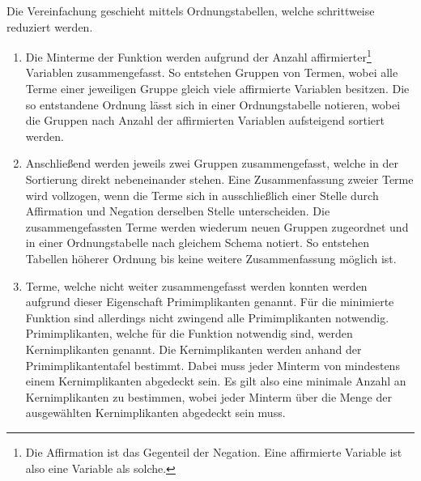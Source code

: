 Die Vereinfachung geschieht mittels Ordnungstabellen, welche schrittweise reduziert werden. 
\begin{enumerate}
  \item Die Minterme der Funktion werden aufgrund der Anzahl affirmierter\footnote{Die Affirmation ist das Gegenteil der Negation. Eine affirmierte Variable ist also eine Variable als solche.} Variablen zusammengefasst. So entstehen Gruppen von Termen, wobei alle Terme einer jeweiligen Gruppe gleich viele affirmierte Variablen besitzen. Die so entstandene Ordnung lässt sich in einer Ordnungstabelle notieren, wobei die Gruppen nach Anzahl der affirmierten Variablen aufsteigend sortiert werden.
  \item Anschließend werden jeweils zwei Gruppen zusammengefasst, welche in der Sortierung direkt nebeneinander stehen. Eine Zusammenfassung zweier Terme wird vollzogen, wenn die Terme sich in ausschließlich einer Stelle durch Affirmation und Negation derselben Stelle unterscheiden. Die zusammengefassten Terme werden wiederum neuen Gruppen zugeordnet und in einer Ordnungstabelle nach gleichem Schema notiert. So entstehen Tabellen höherer Ordnung bis keine weitere Zusammenfassung möglich ist.
  \item Terme, welche nicht weiter zusammengefasst werden konnten werden aufgrund dieser Eigenschaft Primimplikanten genannt. Für die minimierte Funktion sind allerdings nicht zwingend alle Primimplikanten notwendig. Primimplikanten, welche für die Funktion notwendig sind, werden Kernimplikanten genannt. Die Kernimplikanten werden anhand der Primimplikantentafel bestimmt. Dabei muss jeder Minterm von mindestens einem Kernimplikanten abgedeckt sein. Es gilt also eine minimale Anzahl an Kernimplikanten zu bestimmen, wobei jeder Minterm über die Menge der ausgewählten Kernimplikanten abgedeckt sein muss.
\end{enumerate}

